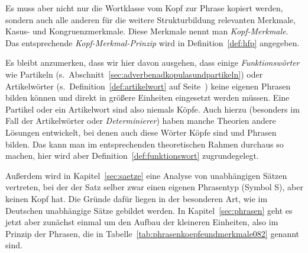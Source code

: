 Es muss aber nicht nur die Wortklasse vom Kopf zur Phrase kopiert werden, sondern auch alle anderen für die weitere Strukturbildung relevanten Merkmale, \zB Kasus- und Kongruenzmerkmale.
Diese Merkmale nennt man \textit{Kopf-Merkmale}.
Das entsprechende \textit{Kopf-Merkmal-Prinzip} wird in Definition~\ref{def:hfp} angegeben.



\Np

Es bleibt anzumerken, dass wir hier davon ausgehen, dass einige \textit{Funktionswörter} wie Partikeln (s.\ Abschnitt~\ref{sec:adverbenadkopulasundpartikeln}) oder Artikelwörter (s.\ Definition~\ref{def:artikelwort} auf Seite~\pageref{def:artikelwort}) keine eigenen Phrasen bilden können und direkt in größere Einheiten eingesetzt werden müssen.
Eine Partikel oder ein Artikelwort sind also niemals Köpfe.
Auch hierzu (besonders im Fall der Artikelwörter oder \textit{Determinierer}) haben manche Theorien andere Lösungen entwickelt, bei denen auch diese Wörter Köpfe sind und Phrasen bilden.
Das kann man im entsprechenden theoretischen Rahmen durchaus so machen, hier wird aber Definition~\ref{def:funktionswort} zugrundegelegt.


Außerdem wird in Kapitel~\ref{sec:saetze} eine Analyse von unabhängigen Sätzen vertreten, bei der der Satz selber zwar einen eigenen Phrasentyp (\zB Symbol S), aber keinen Kopf hat.
Die Gründe dafür liegen in der besonderen Art, wie im Deutschen unabhängige Sätze gebildet werden.
In Kapitel~\ref{sec:phrasen} geht es jetzt aber zunächst einmal um den Aufbau der kleineren Einheiten, also im Prinzip der Phrasen, die in Tabelle~\ref{tab:phrasenkoepfeundmerkmale082} genannt sind.


